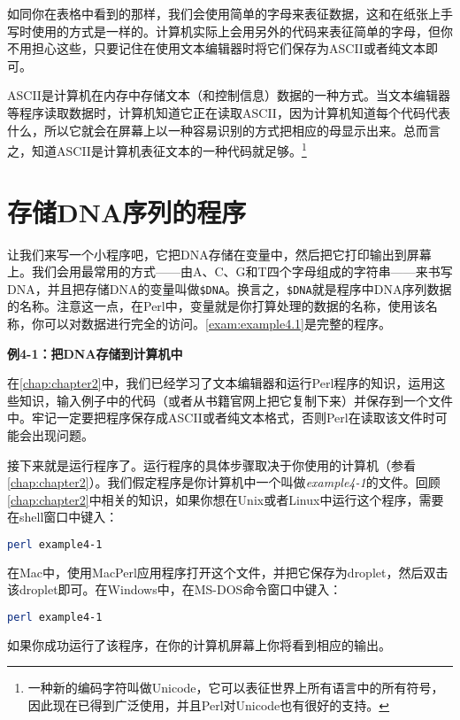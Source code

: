 如同你在表格中看到的那样，我们会使用简单的字母来表征数据，这和在纸张上手写时使用的方式是一样的。计算机实际上会用另外的代码来表征简单的字母，但你不用担心这些，只要记住在使用文本编辑器时将它们保存为ASCII或者纯文本即可。

ASCII是计算机在内存中存储文本（和控制信息）数据的一种方式。当文本编辑器等程序读取数据时，计算机知道它正在读取ASCII，因为计算机知道每个代码代表什么，所以它就会在屏幕上以一种容易识别的方式把相应的母显示出来。总而言之，知道ASCII是计算机表征文本的一种代码就足够。\footnote{一种新的编码字符叫做Unicode，它可以表征世界上所有语言中的所有符号，因此现在已得到广泛使用，并且Perl对Unicode也有很好的支持。}

\section{存储DNA序列的程序}
让我们来写一个小程序吧，它把DNA存储在变量中，然后把它打印输出到屏幕上。我们会用最常用的方式——由A、C、G和T四个字母组成的字符串——来书写DNA，并且把存储DNA的变量叫做\verb|$DNA|。换言之，\verb|$DNA|就是程序中DNA序列数据的名称。注意这一点，在Perl中，变量就是你打算处理的数据的名称，使用该名称，你可以对数据进行完全的访问。\autoref{exam:example4.1}是完整的程序。

\textbf{例4-1：把DNA存储到计算机中}


在\autoref{chap:chapter2}中，我们已经学习了文本编辑器和运行Perl程序的知识，运用这些知识，输入例子中的代码（或者从书籍官网上把它复制下来）并保存到一个文件中。牢记一定要把程序保存成ASCII或者纯文本格式，否则Perl在读取该文件时可能会出现问题。

接下来就是运行程序了。运行程序的具体步骤取决于你使用的计算机（参看\autoref{chap:chapter2}）。我们假定程序是你计算机中一个叫做\textit{example4-1}的文件。回顾\autoref{chap:chapter2}中相关的知识，如果你想在Unix或者Linux中运行这个程序，需要在shell窗口中键入：

\begin{lstlisting}[language=bash]
perl example4-1
\end{lstlisting}

在Mac中，使用MacPerl应用程序打开这个文件，并把它保存为droplet，然后双击该droplet即可。在Windows中，在MS-DOS命令窗口中键入：

\begin{lstlisting}[language=bash]
perl example4-1
\end{lstlisting}

如果你成功运行了该程序，在你的计算机屏幕上你将看到相应的输出。

